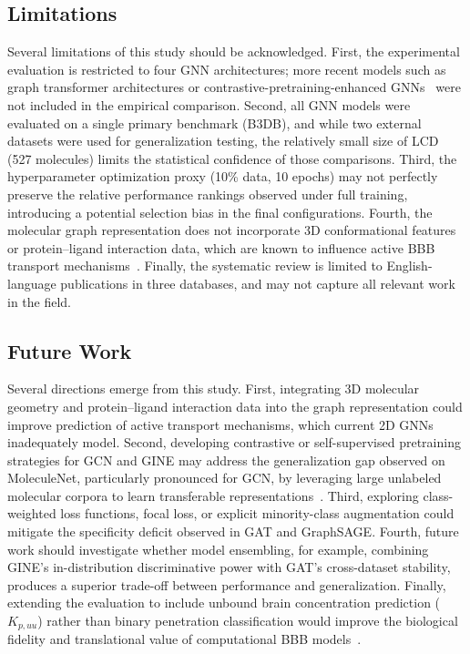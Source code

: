 \documentclass[conference]{IEEEtran}
\begin{document}
\subsection{Limitations}

Several limitations of this study should be acknowledged. First,
the experimental evaluation is restricted to four GNN architectures;
more recent models such as graph transformer architectures or
contrastive-pretraining-enhanced GNNs~\cite{Koutroumpa2025} were not
included in the empirical comparison.
Second, all GNN models were evaluated on a single primary benchmark
(B3DB), and while two external datasets were used for generalization
testing, the relatively small size of LCD (527 molecules) limits
the statistical confidence of those comparisons. Third, the
hyperparameter optimization proxy (10\% data, 10 epochs) may not
perfectly preserve the relative performance rankings observed under
full training, introducing a potential selection bias in the final
configurations. Fourth, the molecular graph representation does not
incorporate 3D conformational features
or protein–ligand interaction data, which are known to influence
active BBB transport mechanisms~\cite{Ding2022}. Finally, the
systematic review is limited to English-language publications in three
databases, and may not capture all relevant work in the field.

\subsection{Future Work}

Several directions emerge from this study. First, integrating 3D
molecular geometry and protein–ligand interaction data into the
graph representation could improve prediction of active transport
mechanisms, which current 2D GNNs inadequately model. Second,
developing contrastive or self-supervised pretraining strategies for
GCN and GINE may address the generalization gap observed on
MoleculeNet, particularly pronounced for GCN, by
leveraging large unlabeled molecular corpora to learn transferable
representations~\cite{Koutroumpa2025}. Third, exploring class-weighted
loss functions, focal loss, or explicit minority-class augmentation
could mitigate the specificity deficit observed in GAT and GraphSAGE.
Fourth, future work should investigate whether model ensembling,
for example, combining GINE's in-distribution discriminative power with
GAT's cross-dataset stability, produces a superior trade-off between
performance and generalization. Finally, extending the evaluation to
include unbound brain concentration prediction ($K_{p,uu}$) rather
than binary penetration classification would improve the biological
fidelity and translational value of computational BBB
models~\cite{Cornelissen2023}.


\nocite{*}

\end{document}
